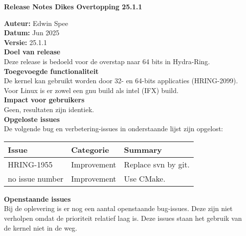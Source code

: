 \documentclass{BOI_References/BOIReleaseNotesLatexClass}
\begin{document}
{\LARGE\textbf{Release Notes Dikes Overtopping 25.1.1}} 

\textbf{Auteur:} Edwin Spee \\
\textbf{Datum:} Jun 2025 \\
\textbf{Versie:} 25.1.1 \\

\textbf{Doel van release} \\
Deze release is bedoeld voor de overstap naar 64 bits in Hydra-Ring. \\

\textbf{Toegevoegde functionaliteit} \\
De kernel kan gebruikt worden door 32- en 64-bits applicaties (HRING-2099). \\
Voor Linux is er zowel een gnu build als intel (IFX) build. \\

\textbf{Impact voor gebruikers} \\
Geen, resultaten zijn identiek. \\[6pt]

\textbf{Opgeloste issues} \\
De volgende bug en verbetering-issues in onderstaande lijst zijn opgelost:

\renewcommand{\arraystretch}{1.2}

\begin{longtable*}{|p{30mm}|p{22mm}|p{\textwidth-52mm-36pt}|} \hline
\textbf{Issue} & \textbf{Categorie} & \textbf{Summary} \\ \hline
HRING-1955 & Improvement  & Replace svn by git. \\ \hline
no issue number & Improvement  & Use CMake. \\ \hline
\end{longtable*}

\textbf{Openstaande issues} \\
Bij de oplevering is er nog een aantal openstaande bug-issues. 
Deze zijn niet verholpen omdat de prioriteit relatief laag is. 
Deze issues staan het gebruik van de kernel niet in de weg.

\end{document}
